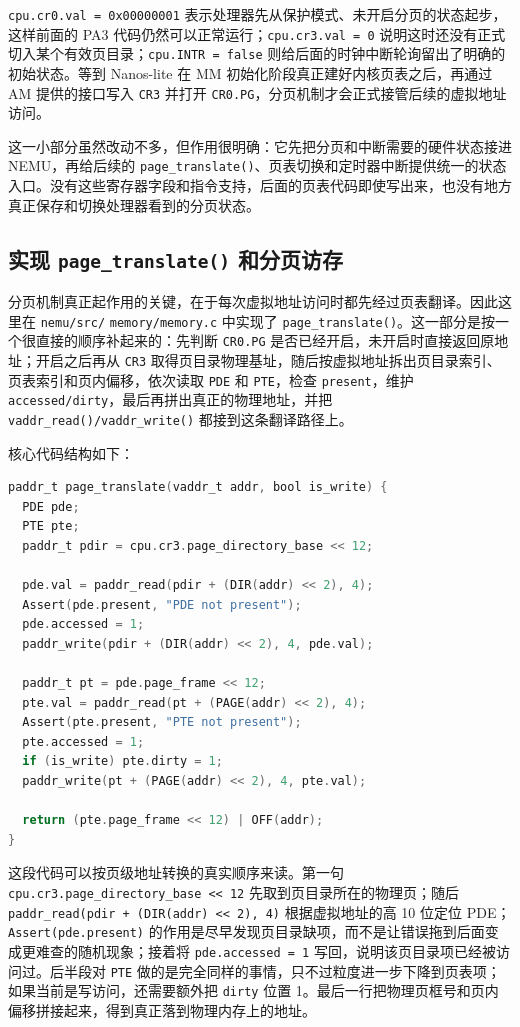 \documentclass[a4paper]{article}
\begin{document}
\texttt{cpu.cr0.val = 0x00000001} 表示处理器先从保护模式、未开启分页的状态起步，这样前面的 PA3 代码仍然可以正常运行；\texttt{cpu.cr3.val = 0} 说明这时还没有正式切入某个有效页目录；\texttt{cpu.INTR = false} 则给后面的时钟中断轮询留出了明确的初始状态。等到 Nanos-lite 在 MM 初始化阶段真正建好内核页表之后，再通过 AM 提供的接口写入 \texttt{CR3} 并打开 \texttt{CR0.PG}，分页机制才会正式接管后续的虚拟地址访问。

这一小部分虽然改动不多，但作用很明确：它先把分页和中断需要的硬件状态接进 NEMU，再给后续的 \texttt{page\_translate()}、页表切换和定时器中断提供统一的状态入口。没有这些寄存器字段和指令支持，后面的页表代码即使写出来，也没有地方真正保存和切换处理器看到的分页状态。

\subsection{实现 \texttt{page\_translate()} 和分页访存}
分页机制真正起作用的关键，在于每次虚拟地址访问时都先经过页表翻译。因此这里在 \texttt{nemu/src/}
\texttt{memory/memory.c} 中实现了 \texttt{page\_translate()}。这一部分是按一个很直接的顺序补起来的：先判断 \texttt{CR0.PG} 是否已经开启，未开启时直接返回原地址；开启之后再从 \texttt{CR3} 取得页目录物理基址，随后按虚拟地址拆出页目录索引、页表索引和页内偏移，依次读取 \texttt{PDE} 和 \texttt{PTE}，检查 \texttt{present}，维护 \texttt{accessed/dirty}，最后再拼出真正的物理地址，并把 \texttt{vaddr\_read()/vaddr\_write()} 都接到这条翻译路径上。

核心代码结构如下：
\begin{lstlisting}[language=C]
paddr_t page_translate(vaddr_t addr, bool is_write) {
  PDE pde;
  PTE pte;
  paddr_t pdir = cpu.cr3.page_directory_base << 12;

  pde.val = paddr_read(pdir + (DIR(addr) << 2), 4);
  Assert(pde.present, "PDE not present");
  pde.accessed = 1;
  paddr_write(pdir + (DIR(addr) << 2), 4, pde.val);

  paddr_t pt = pde.page_frame << 12;
  pte.val = paddr_read(pt + (PAGE(addr) << 2), 4);
  Assert(pte.present, "PTE not present");
  pte.accessed = 1;
  if (is_write) pte.dirty = 1;
  paddr_write(pt + (PAGE(addr) << 2), 4, pte.val);

  return (pte.page_frame << 12) | OFF(addr);
}
\end{lstlisting}

这段代码可以按页级地址转换的真实顺序来读。第一句 \texttt{cpu.cr3.page\_directory\_base << 12} 先取到页目录所在的物理页；随后 \texttt{paddr\_read(pdir + (DIR(addr) << 2), 4)} 根据虚拟地址的高 10 位定位 PDE；\texttt{Assert(pde.present)} 的作用是尽早发现页目录缺项，而不是让错误拖到后面变成更难查的随机现象；接着将 \texttt{pde.accessed = 1} 写回，说明该页目录项已经被访问过。后半段对 \texttt{PTE} 做的是完全同样的事情，只不过粒度进一步下降到页表项；如果当前是写访问，还需要额外把 \texttt{dirty} 位置 1。最后一行把物理页框号和页内偏移拼接起来，得到真正落到物理内存上的地址。
\end{document}
